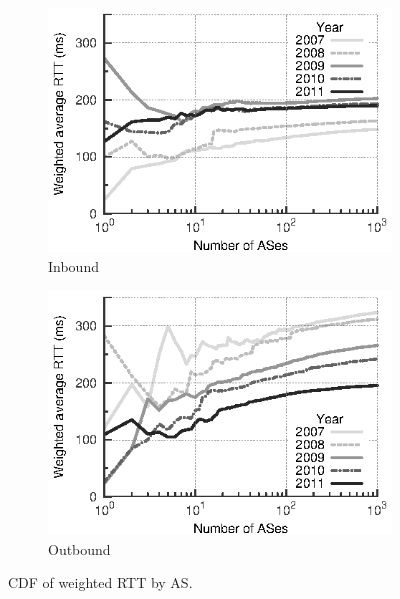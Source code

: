 \begin{figure}
    \centering
    \begin{subfigure}[b]{0.5\linewidth}
        \includegraphics{figures/malawi/rtt_wcdf_in}
        \caption{Inbound}
    \end{subfigure}%
    \begin{subfigure}[b]{0.5\linewidth}
        \includegraphics{figures/malawi/rtt_wcdf_out}
        \caption{Outbound}
    \end{subfigure}%
    \caption{CDF of weighted RTT by AS. \label{fig:rtt_wcdf}}
\end{figure}

